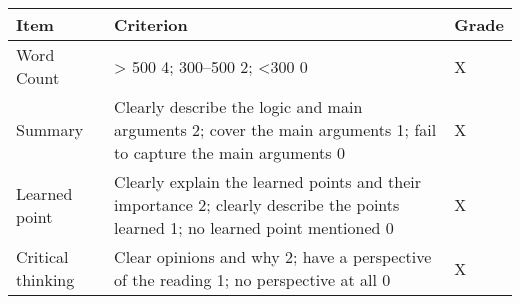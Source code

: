 \documentclass[11pt,]{article}
\theoremstyle{definition}
\theoremstyle{definition}
\theoremstyle{remark}
\begin{document}
\begin{longtable}[]{@{}lll@{}}
\toprule
\begin{minipage}[b]{0.15\columnwidth}\raggedright\strut
Item\strut
\end{minipage} & \begin{minipage}[b]{0.72\columnwidth}\raggedright\strut
Criterion\strut
\end{minipage} & \begin{minipage}[b]{0.05\columnwidth}\raggedright\strut
Grade\strut
\end{minipage}\tabularnewline
\midrule
\endhead
\begin{minipage}[t]{0.15\columnwidth}\raggedright\strut
Word Count\strut
\end{minipage} & \begin{minipage}[t]{0.72\columnwidth}\raggedright\strut
\textgreater{} 500 4; 300--500 2; \textless{}300 0\strut
\end{minipage} & \begin{minipage}[t]{0.05\columnwidth}\raggedright\strut
X\strut
\end{minipage}\tabularnewline
\begin{minipage}[t]{0.15\columnwidth}\raggedright\strut
Summary\strut
\end{minipage} & \begin{minipage}[t]{0.72\columnwidth}\raggedright\strut
Clearly describe the logic and main arguments 2; cover the main
arguments 1; fail to capture the main arguments 0\strut
\end{minipage} & \begin{minipage}[t]{0.05\columnwidth}\raggedright\strut
X\strut
\end{minipage}\tabularnewline
\begin{minipage}[t]{0.15\columnwidth}\raggedright\strut
Learned point\strut
\end{minipage} & \begin{minipage}[t]{0.72\columnwidth}\raggedright\strut
Clearly explain the learned points and their importance 2; clearly
describe the points learned 1; no learned point mentioned 0\strut
\end{minipage} & \begin{minipage}[t]{0.05\columnwidth}\raggedright\strut
X\strut
\end{minipage}\tabularnewline
\begin{minipage}[t]{0.15\columnwidth}\raggedright\strut
Critical thinking\strut
\end{minipage} & \begin{minipage}[t]{0.72\columnwidth}\raggedright\strut
Clear opinions and why 2; have a perspective of the reading 1; no
perspective at all 0\strut
\end{minipage} & \begin{minipage}[t]{0.05\columnwidth}\raggedright\strut
X\strut
\end{minipage}\tabularnewline
\bottomrule
\end{longtable}
\end{document}
